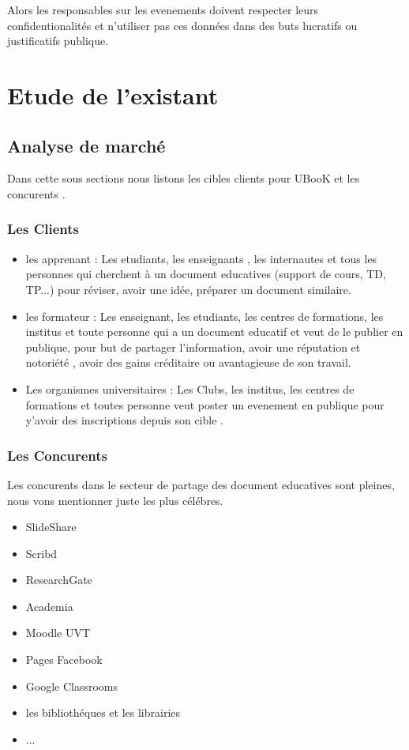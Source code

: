 \documentclass[12pt]{report}
\begin{document}
Alors les responsables sur les evenements doivent respecter leurs confidentionalités et n'utiliser pas ces données dans des buts lucratifs ou justificatifs publique.

\section{Etude de l'existant}

\subsection{Analyse de marché}

Dans cette sous sections nous listons les cibles clients pour UBooK et les concurents .
\subsubsection{Les Clients}
\begin{itemize}
\item les apprenant : Les etudiants, les enseignants , les internautes et tous les personnes qui cherchent à un document educatives (support de cours, TD, TP...) pour réviser, avoir une idée, préparer un document similaire.
\item les formateur : Les enseignant, les etudiants, les centres de formations, les institus et toute personne qui a un document educatif et veut de le publier en publique, pour but de partager l'information, avoir une réputation et notoriété , avoir des gains créditaire ou avantagieuse de son travail.
\item Les organismes universitaires : Les Clubs, les institus, les centres de formations et toutes personne veut poster un evenement en publique pour y'avoir des inscriptions depuis son cible .
\end{itemize}
\subsubsection{Les Concurents}

Les concurents dans le secteur de partage des document educatives sont pleines, nous vons mentionner juste les plus célébres.

\begin{itemize}

\item SlideShare
\item Scribd
\item ResearchGate
\item Academia
\item Moodle UVT
\item Pages Facebook 
\item Google Classrooms
\item les bibliothéques et les librairies
\item ...
\end{itemize}
\end{document}
